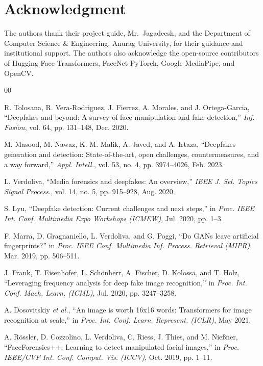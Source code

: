 \documentclass[conference]{IEEEtran}
\begin{document}
\section*{Acknowledgment}
The authors thank their project guide, Mr.~Jagadeesh, and the Department of Computer Science \& Engineering, Anurag University, for their guidance and institutional support. The authors also acknowledge the open-source contributors of Hugging Face Transformers, FaceNet-PyTorch, Google MediaPipe, and OpenCV.

\begin{thebibliography}{00}

 R. Tolosana, R. Vera-Rodriguez, J. Fierrez, A. Morales, and J. Ortega-Garcia, ``Deepfakes and beyond: A survey of face manipulation and fake detection,'' \textit{Inf. Fusion}, vol. 64, pp. 131--148, Dec. 2020.

 M. Masood, M. Nawaz, K. M. Malik, A. Javed, and A. Irtaza, ``Deepfakes generation and detection: State-of-the-art, open challenges, countermeasures, and a way forward,'' \textit{Appl. Intell.}, vol. 53, no. 4, pp. 3974--4026, Feb. 2023.

 L. Verdoliva, ``Media forensics and deepfakes: An overview,'' \textit{IEEE J. Sel. Topics Signal Process.}, vol. 14, no. 5, pp. 915--928, Aug. 2020.

 S. Lyu, ``Deepfake detection: Current challenges and next steps,'' in \textit{Proc. IEEE Int. Conf. Multimedia Expo Workshops (ICMEW)}, Jul. 2020, pp. 1--3.

 F. Marra, D. Gragnaniello, L. Verdoliva, and G. Poggi, ``Do GANs leave artificial fingerprints?'' in \textit{Proc. IEEE Conf. Multimedia Inf. Process. Retrieval (MIPR)}, Mar. 2019, pp. 506--511.

 J. Frank, T. Eisenhofer, L. Sch{\"o}nherr, A. Fischer, D. Kolossa, and T. Holz, ``Leveraging frequency analysis for deep fake image recognition,'' in \textit{Proc. Int. Conf. Mach. Learn. (ICML)}, Jul. 2020, pp. 3247--3258.

 A. Dosovitskiy \textit{et al.}, ``An image is worth 16x16 words: Transformers for image recognition at scale,'' in \textit{Proc. Int. Conf. Learn. Represent. (ICLR)}, May 2021.

 A. R{\"o}ssler, D. Cozzolino, L. Verdoliva, C. Riess, J. Thies, and M. Nie{\ss}ner, ``FaceForensics++: Learning to detect manipulated facial images,'' in \textit{Proc. IEEE/CVF Int. Conf. Comput. Vis. (ICCV)}, Oct. 2019, pp. 1--11.


\end{thebibliography}
\end{document}

